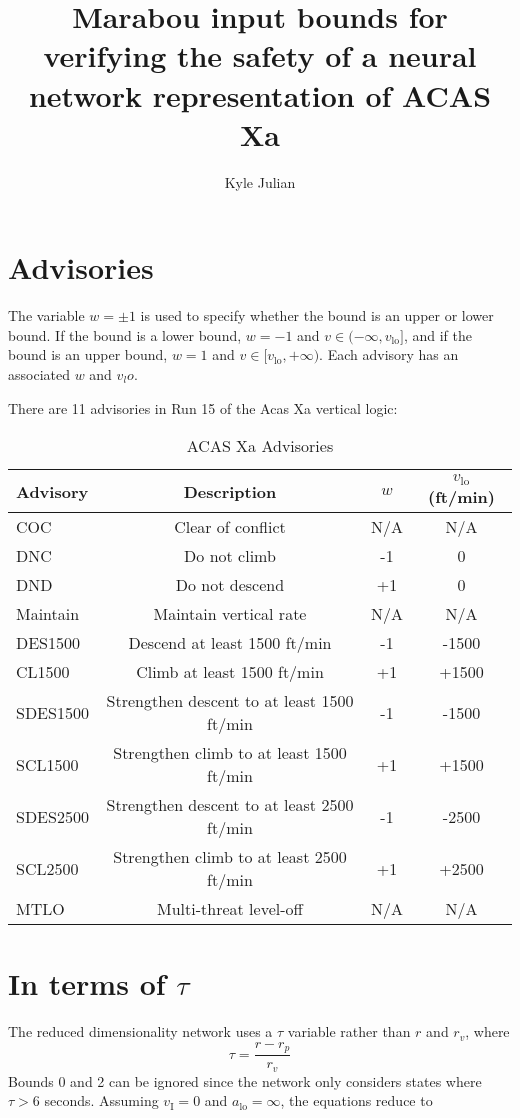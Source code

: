 \documentclass{article}
\begin{document}
	
\title{Marabou input bounds for verifying the safety of a neural network representation of ACAS Xa}
\author{Kyle Julian}
\maketitle

\section{Advisories}
The variable $w=\pm1$ is used to specify whether the bound is an upper or lower bound. If the bound is a lower bound, $w=-1$ and $v \in (-\infty,v_\text{lo}]$, and if the bound is an upper bound, $w=1$ and $v \in [v_\text{lo},+\infty)$. Each advisory has an associated $w$ and $v_lo$.

There are 11 advisories in Run 15 of the Acas Xa vertical logic:

\begin{table}[h!]
	\caption{ACAS Xa Advisories}
	\centering
	\begin{tabular}{lccc}
		\toprule
	Advisory & Description & $w$ & $v_\text{lo}$ (ft/min) \\
		\midrule
		COC & Clear of conflict & N/A & N/A  \\
		DNC & Do not climb & -1 & 0 \\
		DND & Do not descend & +1 & 0 \\
		Maintain & Maintain vertical rate & N/A & N/A \\
		DES1500 & Descend at least 1500 ft/min & -1 & -1500 \\
		CL1500 & Climb at least 1500 ft/min & +1 & +1500 \\
		SDES1500 & Strengthen descent to at least 1500 ft/min & -1 & -1500 \\
		SCL1500 & Strengthen climb to at least 1500 ft/min & +1 & +1500 \\
		SDES2500 & Strengthen descent to  at least 2500 ft/min & -1 & -2500 \\
		SCL2500 & Strengthen climb to at least 2500 ft/min & +1 & +2500 \\
		MTLO & Multi-threat level-off & N/A & N/A \\
		\bottomrule
	\end{tabular}
\end{table}



\section{In terms of $\tau$}
The reduced dimensionality network uses a $\tau$ variable rather than $r$ and $r_v$, where 
\begin{equation}
	\tau=\frac{r-r_p}{r_v}
\end{equation} 
Bounds 0 and 2 can be ignored since the network only considers states where $\tau>6$ seconds. 
Assuming $v_\text{I}=0$ and $a_{\text{lo}}=\infty$, the equations reduce to
\end{document}
